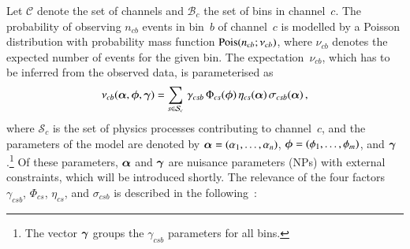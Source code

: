 Let $\mathcal{C}$ denote the set of channels and $\mathcal{B}_{c}$ the set of
bins in channel~$c$. The probability of observing $n_{cb}$ events in bin~$b$ of
channel~$c$ is modelled by a Poisson distribution with probability mass function
$\operatorname{Pois}(n_{cb}; \nu_{cb})$, where $\nu_{cb}$ denotes the expected number of
events for the given bin. The expectation~$\nu_{cb}$, which has to be inferred
from the observed data, is parameterised as~\cite{cranmer2012}
\begin{align*}
  \nu_{cb}(\bm{\alpha}, \bm{\phi}, \bm{\gamma}) =
  \sum_{s \in \mathcal{S}_{c}} \, \gamma_{csb} \, \Phi_{cs}(\bm{\phi}) \, \eta_{cs}(\bm{\alpha}) \, \sigma_{csb}(\bm{\alpha}) \,\text{,}
\end{align*}
where $\mathcal{S}_{c}$ is the set of physics processes contributing to
channel~$c$, and the parameters of the model are denoted by
${\bm{\alpha} = (\alpha_1, \dots, \alpha_n)}$,
${\bm{\phi} = (\phi_1, \dots, \phi_m)}$, and $\bm{\gamma}$.\footnote{The
  vector $\bm{\gamma}$ groups the $\gamma_{csb}$ parameters for all bins.} Of
these parameters, $\bm{\alpha}$ and $\bm{\gamma}$ are nuisance parameters
(NPs) with external constraints, which will be introduced shortly.  The
relevance of the four factors $\gamma_{csb}$, $\Phi_{cs}$, $\eta_{cs}$, and
$\sigma_{csb}$ is described in the following~\cite{cranmer2012}:

